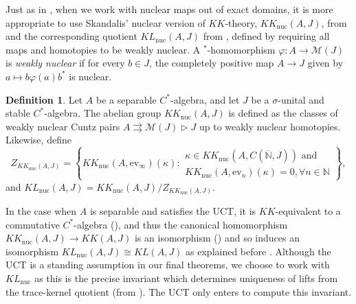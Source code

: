 \documentclass[reqno]{amsart}
\theoremstyle{definition}
\newtheorem{defn}[thm]{Definition}
\theoremstyle{remark}
\numberwithin{equation}{section}
\theoremstyle{definition}
\newcommand{\calM}{\mathcal{M}}
\begin{document}
Just as in \cite{Schafhauser.Annals}, when we work with nuclear maps out of exact domains, it is more appropriate to use Skandalis' nuclear version of $KK$-theory, $KK_{\mathrm{nuc}}(A,J)$, from \cite{Skandalis_88} and the corresponding quotient  $KL_{\mathrm{nuc}}(A,J)$ from \cite{CFP_KN}, defined by requiring all maps and homotopies to be weakly nuclear. A $^*$-homomorphism $\varphi: A\rightarrow \calM(J)$ is \emph{weakly nuclear} if for every $b\in J$, the completely positive map $A\rightarrow J$ given by $a\mapsto b\varphi(a) b^{*}$ is nuclear.

\begin{defn} 
Let $A$ be a separable $C^*$-algebra, and let $J$ be a $\sigma$-unital and stable $C^*$-algebra. The abelian group $KK_{\mathrm{nuc}}(A, J)$ is defined as the classes of weakly nuclear Cuntz pairs $A\rightrightarrows \mathcal M(J)\rhd J$ up to weakly nuclear homotopies. Likewise, define 
\begin{equation} 
Z_{KK_{\mathrm{nuc}}(A, J)} = \left\{ KK_{\mathrm{nuc}}(A, \text{ev}_{\infty}) (\kappa): 
\begin{array}{l}
\kappa \in KK_{\mathrm{nuc}}(A, C(\overline{\mathbb{N}}, J)) \text{ and }\\
KK_{\mathrm{nuc}}(A, \text{ev}_{n}) (\kappa) = 0, \forall n\in \mathbb{N}
\end{array}
\right\}, 
\end{equation} 
and $KL_{\mathrm{nuc}}(A,J) = KK_{\mathrm{nuc}}(A, J) / Z_{KK_{\mathrm{nuc}}(A,J)}$. 
\end{defn} 

In the case when $A$ is separable and satisfies the UCT, it is $KK$-equivalent to a commutative $C^*$-algebra (\cite{RS:UCT}), and thus the canonical homomorphism $KK_{\mathrm{nuc}}(A, J)\rightarrow KK(A, J)$ is an isomorphism (\cite{Skandalis_88}) and so induces an isomorphism $KL_{\mathrm{nuc}}(A, J)\cong KL(A, J)$ as explained before \cite[Theorem 8.11]{Gabe:MAMS}. Although the UCT is a standing assumption in our final theorems, we choose to work with $KL_{\mathrm{nuc}}$ as this is the precise invariant which determines uniqueness of lifts from the trace-kernel quotient (from \cite{Schafhauser.Annals}). The UCT only enters to compute this invariant. 
\end{document}
